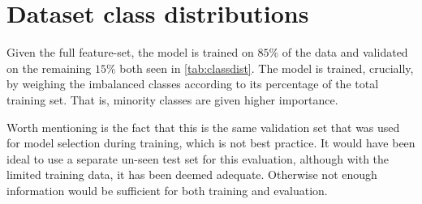 \section{Dataset class distributions}
Given the full feature-set, the model is trained on $85\%$ of the data and validated on the remaining $15\%$ both seen in \ref{tab:classdist}. The model is trained, crucially, by weighing the imbalanced classes according to its percentage of the total training set. That is, minority classes are given higher importance.

Worth mentioning is the fact that this is the same validation set that was used for model selection during training, which is not best practice. It would have been ideal to use a separate un-seen test set for this evaluation, although with the limited training data, it has been deemed adequate. Otherwise not enough information would be sufficient for both training and evaluation. 
